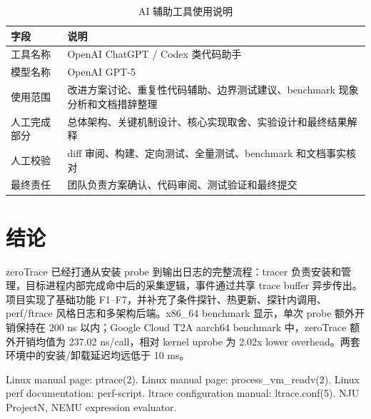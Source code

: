 \documentclass[UTF8,a4paper,11pt,fontset=fandol]{ctexart}
\begin{document}
\begin{table}[H]
\centering
\caption{AI 辅助工具使用说明}
\label{tab:ai-usage}
\begin{tabularx}{\textwidth}{P{3.0cm}Y}
\toprule
\textbf{字段} & \textbf{说明}\\
\midrule
工具名称 & OpenAI ChatGPT / Codex 类代码助手\\
模型名称 & OpenAI GPT-5\\
使用范围 & 改进方案讨论、重复性代码辅助、边界测试建议、benchmark 现象分析和文档措辞整理\\
人工完成部分 & 总体架构、关键机制设计、核心实现取舍、实验设计和最终结果解释\\
人工校验 & diff 审阅、构建、定向测试、全量测试、benchmark 和文档事实核对\\
最终责任 & 团队负责方案确认、代码审阅、测试验证和最终提交\\
\bottomrule
\end{tabularx}
\end{table}

\section{结论}

zeroTrace 已经打通从安装 probe 到输出日志的完整流程：tracer 负责安装和管理，目标进程内部完成命中后的采集逻辑，事件通过共享 trace buffer 异步传出。项目实现了基础功能 F1--F7，并补充了条件探针、热更新、探针内调用、perf/ftrace 风格日志和多架构后端。x86\_64 benchmark 显示，单次 probe 额外开销保持在 200 ns 以内；Google Cloud T2A aarch64 benchmark 中，zeroTrace 额外开销均值为 237.02 ns/call，相对 kernel uprobe 为 2.02x lower overhead。两套环境中的安装/卸载延迟均远低于 10 ms。

\begin{thebibliography}{9}
Linux manual page: ptrace(2).
Linux manual page: process\_vm\_readv(2).
Linux perf documentation: perf-script.
ltrace configuration manual: ltrace.conf(5).
NJU ProjectN, NEMU expression evaluator.
\end{thebibliography}
\end{document}
